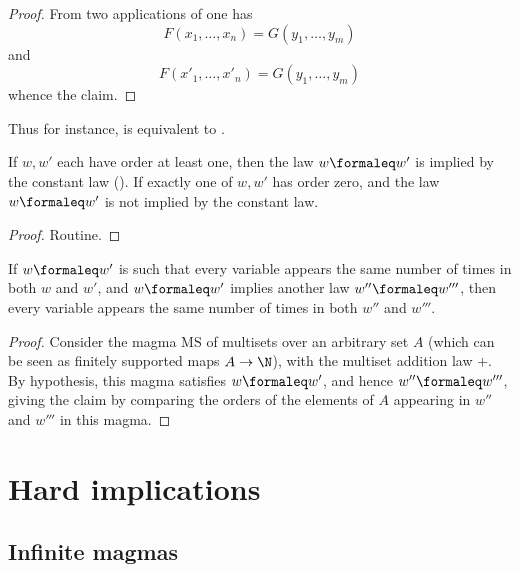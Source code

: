 \begin{proof}
  From two applications of  one has
  $$ F(x_1,\dots,x_n) = G(y_1,\dots,y_m)$$
  and
  $$ F(x'_1,\dots,x'_n) = G(y_1,\dots,y_m)$$
  whence the claim.
\end{proof}

Thus for instance,  is equivalent to .

\begin{theorem}\label{constant-impl}
  If $w, w'$ each have order at least one, then the law $w \formaleq w'$ is implied by the constant law (). If exactly one of $w, w'$ has order zero, and the law $w \formaleq w'$ is not implied by the constant law.
\end{theorem}

\begin{proof}
  Routine.
\end{proof}

\begin{theorem}\label{variable-impl}\leanok
  If $w \formaleq w'$ is such that every variable appears the same number of times in both $w$ and $w'$, and $w \formaleq w'$ implies another law $w'' \formaleq w'''$, then every variable appears the same number of times in both $w''$ and $w'''$.
\end{theorem}

\begin{proof}
  Consider the magma $\mathrm{MS}$ of multisets over an arbitrary set $A$ (which can be seen as finitely supported maps $A\rightarrow \N$), with the multiset addition law $+$. By hypothesis, this magma satisfies $w \formaleq w'$, and hence $w'' \formaleq w'''$, giving the claim by comparing the orders of the elements of $A$ appearing in $w''$ and $w'''$ in this magma.
\end{proof}


\chapter{Hard implications}\label{hard-implications-chapter}

\section{Infinite magmas}

